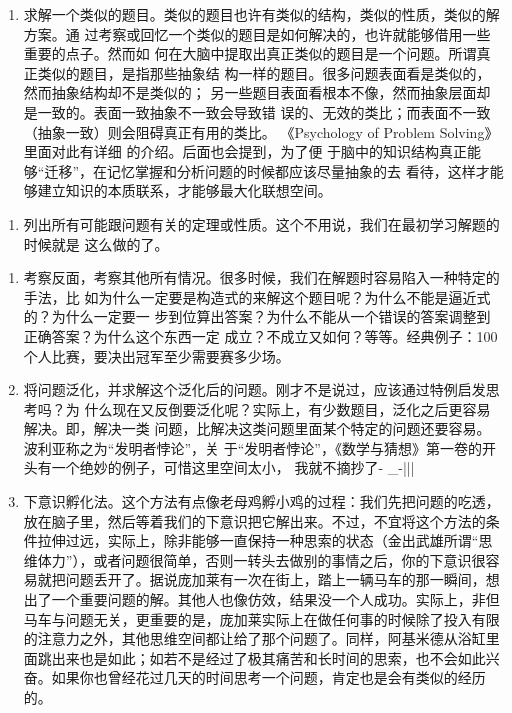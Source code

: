 \documentclass[11pt]{article}
\begin{document}
\begin{itemize}
\begin{enumerate}
\item 求解一个类似的题目。类似的题目也许有类似的结构，类似的性质，类似的解方案。通
过考察或回忆一个类似的题目是如何解决的，也许就能够借用一些重要的点子。然而如
何在大脑中提取出真正类似的题目是一个问题。所谓真正类似的题目，是指那些抽象结
构一样的题目。很多问题表面看是类似的，然而抽象结构却不是类似的；
另一些题目表面看根本不像，然而抽象层面却是一致的。表面一致抽象不一致会导致错
误的、无效的类比；而表面不一致（抽象一致）则会阻碍真正有用的类比。
《Psychology of Problem Solving》里面对此有详细 的介绍。后面也会提到，为了便
于脑中的知识结构真正能够“迁移”，在记忆掌握和分析问题的时候都应该尽量抽象的去
看待，这样才能够建立知识的本质联系，才能够最大化联想空间。
\end{enumerate}


\begin{enumerate}
\item 列出所有可能跟问题有关的定理或性质。这个不用说，我们在最初学习解题的时候就是
这么做的了。
\end{enumerate}


\begin{enumerate}
\item 考察反面，考察其他所有情况。很多时候，我们在解题时容易陷入一种特定的手法，比
如为什么一定要是构造式的来解这个题目呢？为什么不能是逼近式的？为什么一定要一
步到位算出答案？为什么不能从一个错误的答案调整到正确答案？为什么这个东西一定
成立？不成立又如何？等等。经典例子：100个人比赛，要决出冠军至少需要赛多少场。

\item 将问题泛化，并求解这个泛化后的问题。刚才不是说过，应该通过特例启发思考吗？为
什么现在又反倒要泛化呢？实际上，有少数题目，泛化之后更容易解决。即，解决一类
问题，比解决这类问题里面某个特定的问题还要容易。波利亚称之为“发明者悖论”，关
于“发明者悖论”，《数学与猜想》第一卷的开头有一个绝妙的例子，可惜这里空间太小，
我就不摘抄了- \_-|||

\item 下意识孵化法。这个方法有点像老母鸡孵小鸡的过程：我们先把问题的吃透，放在脑子里，然后等着我们的下意识把它解出来。不过，不宜将这个方法的条件拉伸过远，实际上，除非能够一直保持一种思索的状态（金出武雄所谓“思维体力”），或者问题很简单，否则一转头去做别的事情之后，你的下意识很容易就把问题丢开了。据说庞加莱有一次在街上，踏上一辆马车的那一瞬间，想出了一个重要问题的解。其他人也像仿效，结果没一个人成功。实际上，非但马车与问题无关，更重要的是，庞加莱实际上在做任何事的时候除了投入有限的注意力之外，其他思维空间都让给了那个问题了。同样，阿基米德从浴缸里面跳出来也是如此；如若不是经过了极其痛苦和长时间的思索，也不会如此兴奋。如果你也曾经花过几天的时间思考一个问题，肯定也是会有类似的经历的。
\end{enumerate}



\end{itemize}
\end{document}
